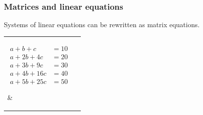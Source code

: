 \documentclass[9pt]{beamer}
\begin{document}
\begin{frame}[t]
 \frametitle{Matrices and linear equations}
 Systems of linear equations can be rewritten as matrix equations.
 \begin{tabular}{ll}
  \parbox[t]{4.8cm}{
   \begin{align*}
    a +  b +  c  &= 10 \\
    a + 2b + 4c  &= 20 \\
    a + 3b + 9c  &= 30 \\
    a + 4b + 16c &= 40 \\
    a + 5b + 25c &= 50
   \end{align*}
  } &  \parbox[t]{4.8cm}{
  }
 \end{tabular}
\end{frame}
\end{document}
